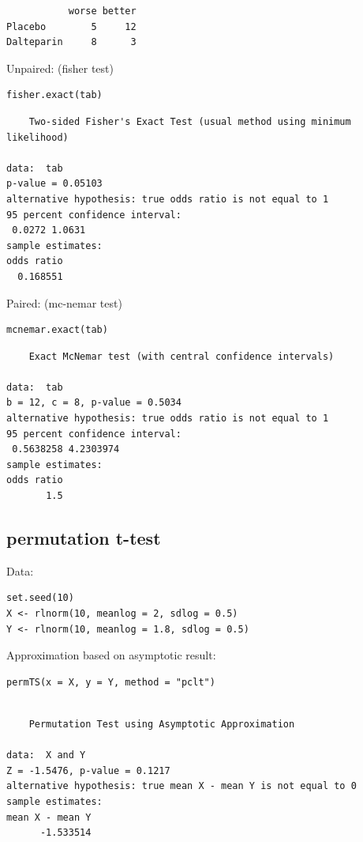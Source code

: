 \documentclass{article}
\begin{document}
\begin{verbatim}
           worse better
Placebo        5     12
Dalteparin     8      3
\end{verbatim}

Unpaired: (fisher test)
\lstset{language=r,label= ,caption= ,captionpos=b,numbers=none}
\begin{lstlisting}
fisher.exact(tab)
\end{lstlisting}

\begin{verbatim}
	Two-sided Fisher's Exact Test (usual method using minimum likelihood)

data:  tab
p-value = 0.05103
alternative hypothesis: true odds ratio is not equal to 1
95 percent confidence interval:
 0.0272 1.0631
sample estimates:
odds ratio 
  0.168551
\end{verbatim}


Paired: (mc-nemar test)
\lstset{language=r,label= ,caption= ,captionpos=b,numbers=none}
\begin{lstlisting}
mcnemar.exact(tab)
\end{lstlisting}

\begin{verbatim}
	Exact McNemar test (with central confidence intervals)

data:  tab
b = 12, c = 8, p-value = 0.5034
alternative hypothesis: true odds ratio is not equal to 1
95 percent confidence interval:
 0.5638258 4.2303974
sample estimates:
odds ratio 
       1.5
\end{verbatim}

\subsection{permutation t-test}
\label{sec:org8a92f8a}

Data:
\lstset{language=r,label= ,caption= ,captionpos=b,numbers=none}
\begin{lstlisting}
set.seed(10)
X <- rlnorm(10, meanlog = 2, sdlog = 0.5)
Y <- rlnorm(10, meanlog = 1.8, sdlog = 0.5)
\end{lstlisting}

Approximation based on asymptotic result:
\lstset{language=r,label= ,caption= ,captionpos=b,numbers=none}
\begin{lstlisting}
permTS(x = X, y = Y, method = "pclt")
\end{lstlisting}

\begin{verbatim}

	Permutation Test using Asymptotic Approximation

data:  X and Y
Z = -1.5476, p-value = 0.1217
alternative hypothesis: true mean X - mean Y is not equal to 0
sample estimates:
mean X - mean Y 
      -1.533514
\end{verbatim}
\end{document}
